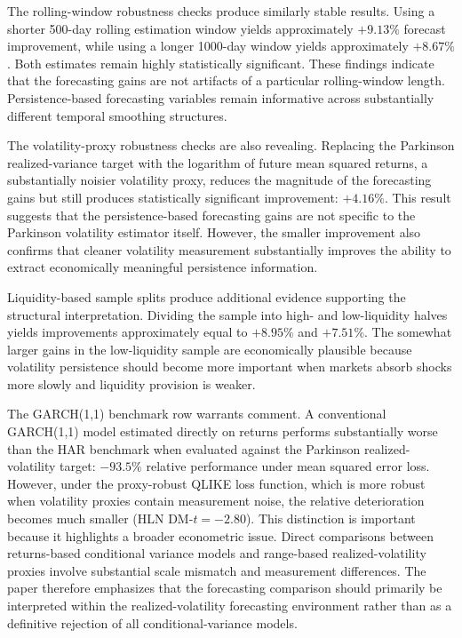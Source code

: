 \documentclass[unnumsec,webpdf,contemporary,large]{oup-authoring-template}%
\theoremstyle{thmstyleone}%
\theoremstyle{thmstyletwo}%
\theoremstyle{thmstylethree}%
\begin{document}
The rolling-window robustness checks produce similarly stable results.
Using a shorter 500-day rolling estimation window yields approximately
$+9.13\%$ forecast improvement, while using a longer 1000-day window
yields approximately $+8.67\%$. Both estimates remain highly statistically
significant. These findings indicate that the forecasting gains are not
artifacts of a particular rolling-window length. Persistence-based
forecasting variables remain informative across substantially different
temporal smoothing structures.

The volatility-proxy robustness checks are also revealing. Replacing the
Parkinson realized-variance target with the logarithm of future mean
squared returns, a substantially noisier volatility proxy, reduces
the magnitude of the forecasting gains but still produces statistically
significant improvement: $+4.16\%$. This result suggests that the
persistence-based forecasting gains are not specific to the Parkinson
volatility estimator itself. However, the smaller improvement also confirms
that cleaner volatility measurement substantially improves the ability to
extract economically meaningful persistence information.

Liquidity-based sample splits produce additional evidence supporting the
structural interpretation. Dividing the sample into high- and
low-liquidity halves yields improvements approximately equal to $+8.95\%$
and $+7.51\%$. The somewhat larger gains in the low-liquidity sample are
economically plausible because volatility persistence should become more
important when markets absorb shocks more slowly and liquidity provision
is weaker.

The GARCH(1,1) benchmark row warrants comment. A conventional GARCH(1,1)
model estimated directly on returns performs substantially worse than the
HAR benchmark when evaluated against the Parkinson realized-volatility
target: $-93.5\%$ relative performance under mean squared error loss.
However, under the proxy-robust QLIKE loss function, which is more
robust when volatility proxies contain measurement noise, the relative
deterioration becomes much smaller (HLN DM-$t = -2.80$). This distinction
is important because it highlights a broader econometric issue. Direct
comparisons between returns-based conditional variance models and
range-based realized-volatility proxies involve substantial scale mismatch
and measurement differences. The paper therefore emphasizes that the
forecasting comparison should primarily be interpreted within the
realized-volatility forecasting environment rather than as a definitive
rejection of all conditional-variance models.
\end{document}

